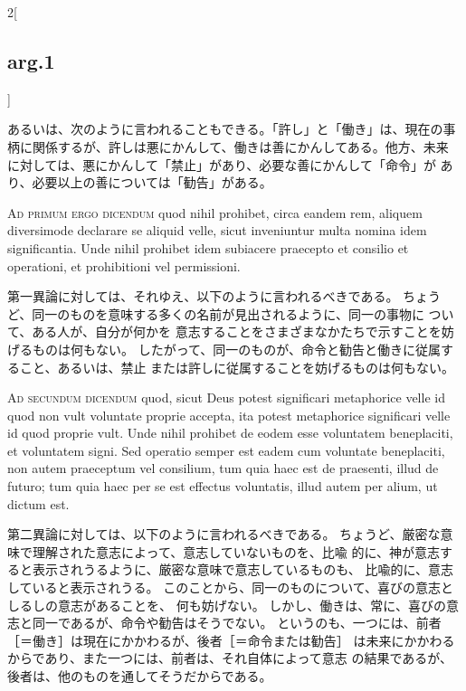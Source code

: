 \documentclass[paper=a4paper,fontsize=10pt,jafontsize=9pt,titlepage]{jlreq}
\begin{document}
\begin{paracol}{2}[\subsection{arg.1}]
\switchcolumn

あるいは、次のように言われることもできる。「許し」と「働き」は、現在の事
 柄に関係するが、許しは悪にかんして、働きは善にかんしてある。他方、未来
 に対しては、悪にかんして「禁止」があり、必要な善にかんして「命令」が
 あり、必要以上の善については「勧告」がある。

\switchcolumn*[\subsection{ad.1}]


{\scshape Ad primum ergo dicendum} quod nihil prohibet,
circa eandem rem, aliquem diversimode declarare se aliquid velle, sicut
inveniuntur multa nomina idem significantia. Unde nihil prohibet idem
subiacere praecepto et consilio et operationi, et prohibitioni vel
permissioni.

\switchcolumn

第一異論に対しては、それゆえ、以下のように言われるべきである。
ちょうど、同一のものを意味する多くの名前が見出されるように、同一の事物に
 ついて、ある人が、自分が何かを
 意志することをさまざまなかたちで示すことを妨げるものは何もない。
したがって、同一のものが、命令と勧告と働きに従属すること、あるいは、禁止
 または許しに従属することを妨げるものは何もない。

\switchcolumn*[\subsection{ad.2}]


{\scshape Ad secundum dicendum} quod, sicut Deus potest
significari metaphorice velle id quod non vult voluntate proprie
accepta, ita potest metaphorice significari velle id quod proprie
vult. Unde nihil prohibet de eodem esse voluntatem beneplaciti, et
voluntatem signi. Sed operatio semper est eadem cum voluntate
beneplaciti, non autem praeceptum vel consilium, tum quia haec est de
praesenti, illud de futuro; tum quia haec per se est effectus
voluntatis, illud autem per alium, ut dictum est.

\switchcolumn

第二異論に対しては、以下のように言われるべきである。
ちょうど、厳密な意味で理解された意志によって、意志していないものを、比喩
 的に、神が意志すると表示されうるように、厳密な意味で意志しているものも、
 比喩的に、意志していると表示されうる。
このことから、同一のものについて、喜びの意志としるしの意志があることを、
 何も妨げない。
しかし、働きは、常に、喜びの意志と同一であるが、命令や勧告はそうでない。
 というのも、一つには、前者［＝働き］は現在にかかわるが、後者［＝命令または勧告］
 は未来にかかわるからであり、また一つには、前者は、それ自体によって意志
 の結果であるが、後者は、他のものを通してそうだからである。


\end{paracol}
\end{document}
